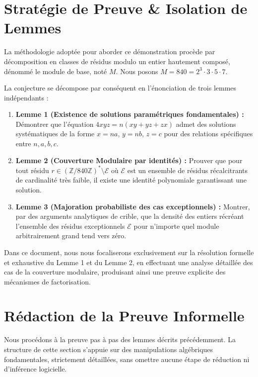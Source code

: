 \documentclass[11pt,a4paper]{article}
\theoremstyle{definition}
\theoremstyle{remark}
\begin{document}
\section{Strat\'egie de Preuve \& Isolation de Lemmes}

La m\'ethodologie adopt\'ee pour aborder ce d\'emonstration proc\`ede par d\'ecomposition en classes de r\'esidus modulo un entier hautement compos\'e, d\'enomm\'e le module de base, not\'e $M$. Nous posons $M = 840 = 2^3 \cdot 3 \cdot 5 \cdot 7$.

La conjecture se d\'ecompose par cons\'equent en l'\'enonciation de trois lemmes ind\'ependants :

\begin{enumerate}
\item \textbf{Lemme 1 (Existence de solutions param\'etriques fondamentales) :} D\'emontrer que l'\'equation $4xyz = n(xy + yz + zx)$ admet des solutions syst\'ematiques de la forme $x = na$, $y = nb$, $z = c$ pour des relations sp\'ecifiques entre $n, a, b, c$.
\item \textbf{Lemme 2 (Couverture Modulaire par identit\'es) :} Prouver que pour tout r\'esidu $r \in (\mathbb{Z}/840\mathbb{Z})^* \setminus \mathcal{E}$ o\`u $\mathcal{E}$ est un ensemble de r\'esidus r\'ecalcitrants de cardinalit\'e tr\`es faible, il existe une identit\'e polynomiale garantissant une solution.
\item \textbf{Lemme 3 (Majoration probabiliste des cas exceptionnels) :} Montrer, par des arguments analytiques de crible, que la densit\'e des entiers r\'ecr\'eant l'ensemble des r\'esidus exceptionnels $\mathcal{E}$ pour n'importe quel module arbitrairement grand tend vers z\'ero.
\end{enumerate}

Dans ce document, nous nous focaliserons exclusivement sur la r\'esolution formelle et exhaustive du Lemme 1 et du Lemme 2, en effectuant une analyse d\'etaill\'ee des cas de la couverture modulaire, produisant ainsi une preuve explicite des m\'ecanismes de factorisation.
\section{R\'edaction de la Preuve Informelle}

Nous proc\'edons \`a la preuve pas \`a pas des lemmes d\'ecrits pr\'ec\'edemment. La structure de cette section s'appuie sur des manipulations alg\'ebriques fondamentales, strictement d\'etaill\'ees, sans omettre aucune \'etape de r\'eduction ni d'inf\'erence logicielle.
\end{document}
